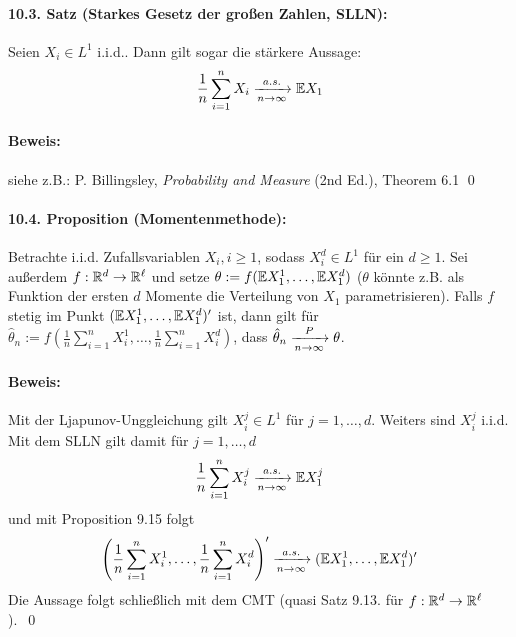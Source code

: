\paragraph{10.3. Satz (Starkes Gesetz der gro\ss{}en Zahlen, SLLN):} Seien
$X_i\in L^1$ i.i.d.. Dann gilt sogar die st\"arkere Aussage: 
$$\dfrac{1}{n}\sum_{i=1}^nX_i\nto{a.s.}{n\to\infty}\E X_1$$ 

\paragraph{Beweis:} siehe z.B.: P. Billingsley, \textit{Probability and Measure} (2nd Ed.), Theorem 6.1 \qed

\paragraph{10.4. Proposition (Momentenmethode):} Betrachte i.i.d. Zufallsvariablen $X_i,i\geq1$, sodass $X_i^d\in L^1$ f\"ur ein $d\geq1$. Sei außerdem $f:\mathbb{R}^d\to\mathbb{R}^\ell$ und setze $\theta:=f(\mathbb{E} X_1^1,\hdots,\mathbb{E} X_1^d)$ ($\theta$ könnte z.B. als Funktion der ersten $d$ Momente die Verteilung von $X_1$ parametrisieren). Falls $f$ stetig im Punkt $(\mathbb{E} X_1^1,\hdots,\mathbb{E} X_1^d)'$ ist, dann gilt f\"ur $\hat\theta_n:=f\left(\frac{1}{n}\sum_{i=1}^nX_i^1,\hdots,\frac{1}{n}\sum_{i=1}^nX_i^d\right)$, dass $\hat\theta_n\nto{P}{n\to\infty}\theta$.

\paragraph{Beweis:}Mit der Ljapunov-Unggleichung gilt $X_i^j\in L^1$ f\"ur $j=1,\hdots,d$. Weiters sind $X_i^j$ i.i.d. Mit dem SLLN gilt damit f\"ur $j=1,\hdots,d$
$$\dfrac{1}{n}\sum_{i=1}^nX_i^j\nto{a.s.}{n\to\infty}\E X_1^j$$
und mit Proposition 9.15 folgt 
$$\left(\frac{1}{n}\sum_{i=1}^nX_i^1,\hdots,\frac{1}{n}\sum_{i=1}^nX_i^d\right)'\nto{a.s.}{n\to\infty}(\E X_1^1,\hdots,\E X_1^d)'$$
Die Aussage folgt schließlich mit dem CMT (quasi Satz 9.13. f\"ur $f:\mathbb{R}^d\to\mathbb{R}^\ell$). \qed 
